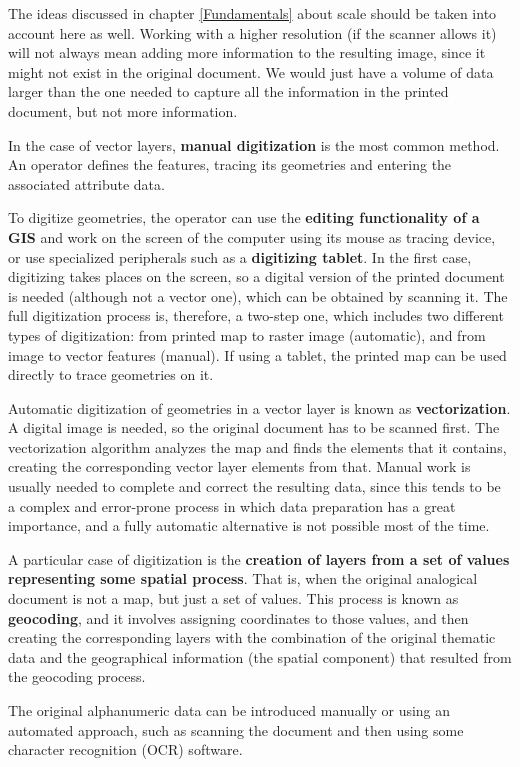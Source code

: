 The ideas discussed in chapter \ref{Fundamentals} about scale should be taken into account here as well. Working with a higher resolution (if the scanner allows it) will not always mean adding more information to the resulting image, since it might not exist in the original document. We would just have a volume of data larger than the one needed to capture all the information in the printed document, but not more information.

In the case of vector layers, \textbf{manual digitization} is the most common method. An operator defines the features, tracing its geometries and entering the associated attribute data.

To digitize geometries, the operator can use the \textbf{editing functionality of a GIS} and work on the screen of the computer using its mouse as tracing device, or use specialized peripherals such as a \textbf{digitizing tablet}. In the first case, digitizing takes places on the screen, so a digital version of the printed document is needed (although not a vector one), which can be obtained by scanning it. The full digitization process is, therefore, a two-step one, which includes two different types of digitization: from printed map to raster image (automatic), and from image to vector features (manual). If using a tablet, the printed map can be used directly to trace geometries on it.

Automatic digitization of geometries in a vector layer is known as \textbf{vectorization}. A digital image is needed, so the original document has to be scanned first. The vectorization algorithm analyzes the map and finds the elements that it contains, creating the corresponding vector layer elements from that. Manual work is usually needed to complete and correct the resulting data, since this tends to be a complex and error-prone process in which data preparation has a great importance, and a fully automatic alternative is not possible most of the time.

A particular case of digitization is the \textbf{creation of layers from a set of values representing some spatial process}. That is, when the original analogical document is not a map, but just a set of values. This process is known as \textbf{geocoding}, and it involves assigning coordinates to those values, and then creating the corresponding layers with the combination of the original thematic data and the geographical information (the spatial component) that resulted from the geocoding process.

The original alphanumeric data can be introduced manually or using an automated approach, such as scanning the document and then using some character recognition (OCR) software.

